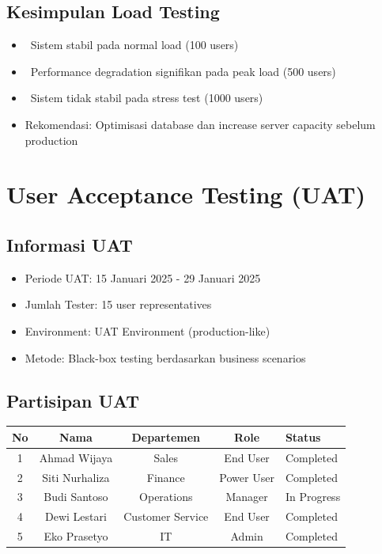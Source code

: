 \documentclass[12pt,a4paper]{article}
\newcommand{\cmark}{\ding{51}}
\newcommand{\xmark}{\ding{55}}
\newcommand{\warn}{\ding{115}}
\begin{document}
\subsection{Kesimpulan Load Testing}
\begin{itemize}
  \item \cmark\ Sistem stabil pada normal load (100 users)
  \item \warn\ Performance degradation signifikan pada peak load (500 users)
  \item \xmark\ Sistem tidak stabil pada stress test (1000 users)
  \item Rekomendasi: Optimisasi database dan increase server capacity sebelum production
\end{itemize}

\section{User Acceptance Testing (UAT)}
\subsection{Informasi UAT}
\begin{itemize}
  \item Periode UAT: 15 Januari 2025 - 29 Januari 2025
  \item Jumlah Tester: 15 user representatives
  \item Environment: UAT Environment (production-like)
  \item Metode: Black-box testing berdasarkan business scenarios
\end{itemize}

\subsection{Partisipan UAT}
\begin{tabularx}{\textwidth}{@{}ccccX@{}}
\toprule
No & Nama & Departemen & Role & Status \\
\midrule
1 & Ahmad Wijaya & Sales & End User & Completed \\
2 & Siti Nurhaliza & Finance & Power User & Completed \\
3 & Budi Santoso & Operations & Manager & In Progress \\
4 & Dewi Lestari & Customer Service & End User & Completed \\
5 & Eko Prasetyo & IT & Admin & Completed \\
\bottomrule
\end{tabularx}
\end{document}
